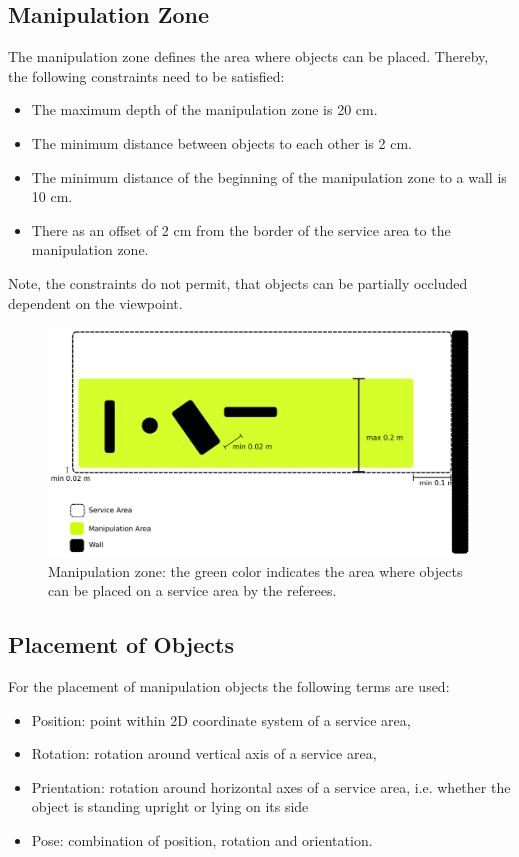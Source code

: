 \subsection{Manipulation Zone} \label{ssec:ManipulationZone}
The manipulation zone defines the area where objects can be placed. Thereby, the following constraints need to be satisfied:
\begin{itemize}
	\item The maximum depth of the manipulation zone is 20 cm.
	\item The minimum distance between objects to each other is 2 cm.
	\item The minimum distance of the beginning of the manipulation zone to a wall is 10 cm.
	\item There as an offset of 2 cm from the border of the service area to the manipulation zone.
\end{itemize}
Note, the constraints do not permit, that objects can be partially occluded dependent on the viewpoint.
\begin{figure} [h!]
\centering
\includegraphics[width=1.0\textwidth ]{./images/manipulation_zone.pdf}
\caption{Manipulation zone: the green color indicates the area where objects can be placed on a service area by the referees.}
\label{fig:manipulation_zone}
\end{figure}




\subsection{Placement of Objects}
For the placement of manipulation objects the following terms are used:

\begin{itemize}
\item Position: point within 2D coordinate system of a service area,
\item Rotation: rotation around vertical axis of a service area,
\item Prientation: rotation around horizontal axes of a service area, i.e. whether the object is standing upright or lying on its side
\item Pose: combination of position, rotation and orientation.
\end{itemize}

